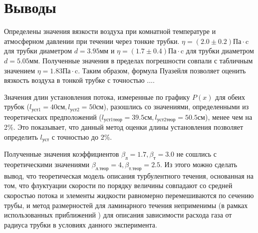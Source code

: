 \section{Выводы}
Определены значения вязкости воздуха при комнатной температуре и атмосферном давлении при течении через тонкие трубки. $\eta = (2.0\pm 0.2)\text{Па}\cdot\text{c}$ для трубки диаметром $d = 3.95\text{мм}$ и $\eta = (1.7\pm 0.4)\text{Па}\cdot\text{c}$ для трубки диаметром $d = 5.05\text{мм}$. Полученные значения в пределах погрешности совпали с табличным значением $\eta = 1.83\text{Па}\cdot\text{c}$. Таким образом, формула Пуазейля позволяет оценить вязкость воздуха в тонкой трубке с точностью ....

Значения длин установления потока, измеренные по графику $P(x)$ для обеих трубок ($l_\text{уст1} = 40\text{см}, l_\text{уст2} = 50\text{см}$), разошлись со значениями, определенными из теоретических предположений ($l_\text{уст1теор} = 39.5\text{см}, l_\text{уст2теор} = 50.5\text{см}$), менее чем на 2\%. Это показывает, что данный метод оценки длины установления позволяет определить $l_\text{уст}$ с точностью до 2\%.

Полученные значения коэффициентов $\beta_\text{л} = 1.7, \beta_\text{т} = 3.0$ не сошлись с теоретическими значениями  $\beta_\text{л.теор} = 4, \beta_\text{т.теор} = 2.5$. Из этого можно сделать вывод, что теоретическая модель описания турбулентного течения, основанная на том, что флуктуации скорости по порядку величины совпадают со средней скоростью потока и элементы жидкости равномерно перемешиваются по сечению трубы, и метод размерностей для ламинарного течения неприменимы (в рамках использованных приближений ) для описания зависимости расхода газа от радиуса трубки в условиях данного эксперимента.